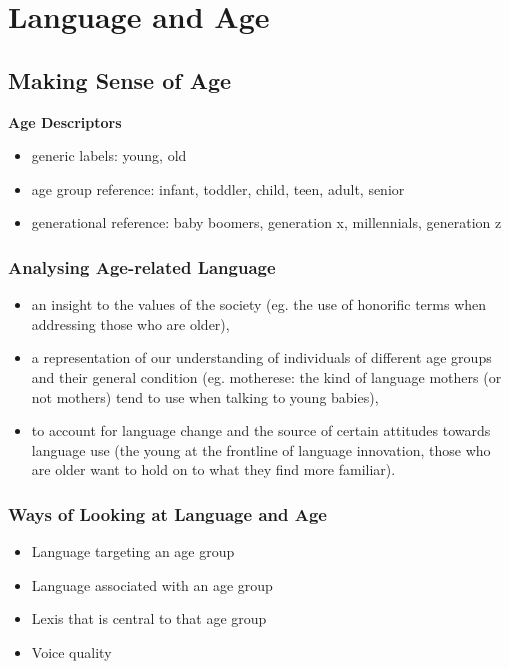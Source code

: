 \documentclass[../main.tex]{subfiles}
\begin{document}
\section{Language and Age}

\subsection{Making Sense of Age}
\textbf{Age Descriptors} \begin{itemize}
	\item generic labels: young, old
	\item age group reference: infant, toddler, child, teen, adult, senior
	\item generational reference: baby boomers, generation x, millennials, generation z
\end{itemize}

\subsubsection{Analysing Age-related Language}
\begin{itemize}
	\item an insight to the values of the society (eg. the use of honorific terms when addressing those who are older),
	\item a representation of our understanding of individuals of different age groups and their general condition (eg. motherese: the kind of language mothers (or not mothers) tend to use when talking to young babies),
	\item to account for language change and the source of certain attitudes towards language use (the young at the frontline of language innovation, those who are older want to hold on to what they find more familiar). 
\end{itemize}

\subsubsection{Ways of Looking at Language and Age}
\begin{itemize}
	\item Language targeting an age group
	\item Language associated with an age group
	\item Lexis that is central to that age group
	\item Voice quality
\end{itemize}
\end{document}

